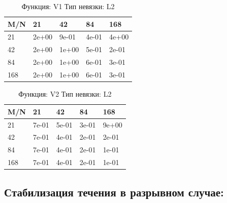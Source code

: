 \documentclass[a4paper,11pt]{article}
\begin{document}
\begin{table}[H]
\caption {Функция: V1 Тип невязки: L2  }
\begin{center}
\begin{tabular}{l|l|l|l|l}
\hline
M/N  & 21 & 42 & 84 & 168 \\ \hline
  21 & 2e+00& 9e-01& 4e-01& 4e+00\\ \hline
  42 & 2e+00& 1e+00& 5e-01& 2e-01\\ \hline
  84 & 2e+00& 1e+00& 6e-01& 3e-01\\ \hline
 168 & 2e+00& 1e+00& 6e-01& 3e-01\\ \hline
\end{tabular}
\end{center}
\end{table}
\begin{table}[H]
\caption {Функция: V2 Тип невязки: L2  }
\begin{center}
\begin{tabular}{l|l|l|l|l}
\hline
M/N  & 21 & 42 & 84 & 168 \\ \hline
  21 & 7e-01& 5e-01& 3e-01& 9e+00\\ \hline
  42 & 7e-01& 4e-01& 2e-01& 2e-01\\ \hline
  84 & 7e-01& 4e-01& 2e-01& 1e-01\\ \hline
 168 & 7e-01& 4e-01& 2e-01& 1e-01\\ \hline
\end{tabular}
\end{center}
\end{table}

\subsection{Стабилизация течения в разрывном случае:}

\newpage
\end{document}

